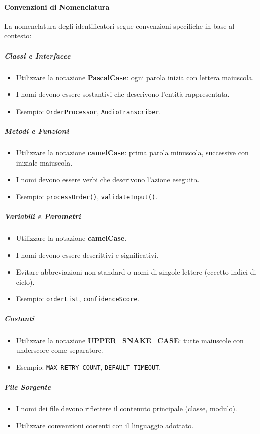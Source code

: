 \documentclass[a4paper, 11pt, oneside]{scrartcl} %
\begin{document}
\paragraph{Convenzioni di Nomenclatura}
La nomenclatura degli identificatori segue convenzioni specifiche in base al contesto:

\subparagraph{Classi e Interfacce}
\begin{itemize}
    \item Utilizzare la notazione \textbf{PascalCase}{\scriptsize{}}: ogni parola inizia con lettera maiuscola.
    \item I nomi devono essere sostantivi che descrivono l'entità rappresentata.
    \item Esempio: \texttt{OrderProcessor}, \texttt{AudioTranscriber}.
\end{itemize}

\subparagraph{Metodi e Funzioni}
\begin{itemize}
    \item Utilizzare la notazione \textbf{camelCase}{\scriptsize{}}: prima parola minuscola, successive con iniziale maiuscola.
    \item I nomi devono essere verbi che descrivono l'azione eseguita.
    \item Esempio: \texttt{processOrder()}, \texttt{validateInput()}.
\end{itemize}

\subparagraph{Variabili e Parametri}
\begin{itemize}
    \item Utilizzare la notazione \textbf{camelCase}.
    \item I nomi devono essere descrittivi e significativi.
    \item Evitare abbreviazioni non standard o nomi di singole lettere (eccetto indici di ciclo).
    \item Esempio: \texttt{orderList}, \texttt{confidenceScore}.
\end{itemize}

\subparagraph{Costanti}
\begin{itemize}
    \item Utilizzare la notazione \textbf{UPPER\_SNAKE\_CASE}: tutte maiuscole con underscore come separatore.
    \item Esempio: \texttt{MAX\_RETRY\_COUNT}, \texttt{DEFAULT\_TIMEOUT}.
\end{itemize}

\subparagraph{File Sorgente}
\begin{itemize}
    \item I nomi dei file devono riflettere il contenuto principale (classe, modulo).
    \item Utilizzare convenzioni coerenti con il linguaggio adottato.
\end{itemize}
\end{document}
